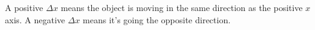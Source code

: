 A positive $\Delta x$ means the object is moving in the same
direction as the positive $x$ axis. A negative $\Delta x$ means it's
going the opposite direction.
